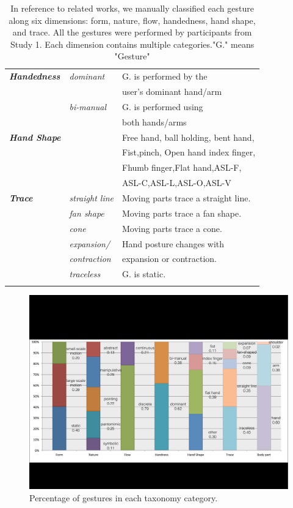 \documentclass{sigchi}
\begin{document}
\begin{table}
\begin{adjustwidth}{-0.4cm}{}
\begin{tabular}{|l|l|l|}
    \textit{\textbf {Handedness}} & {\it dominant} & G. is performed by the \\&&user's dominant hand/arm \\ \cline{2-3}
    &{\it bi-manual}&G. is performed using \\&&both hands/arms\\
    \Xhline{4\arrayrulewidth}
    \textit{\textbf {Hand Shape}} &&Free hand, ball holding, bent hand,\\&& Fist,pinch, Open hand
    index finger,\\&&Fhumb finger,Flat hand,ASL-F,\\&&ASL-C,ASL-L,ASL-O,ASL-V\\
    \Xhline{4\arrayrulewidth}
    \textit{\textbf {Trace}}&{\it straight line}&Moving parts trace a straight line.\\ \cline{2-3}
    &{\it fan shape}&Moving parts trace a fan shape.\\ \cline{2-3}
    &{\it cone}&Moving parts trace a cone.\\ \cline{2-3}
    &{\it expansion/}&Hand posture changes with \\&{\it contraction}&expansion or contraction.\\
     \cline{2-3}
    &{\it traceless}&G. is static.\\
    \Xhline{4\arrayrulewidth}
  \end{tabular}
  \caption{In reference to related works, we manually classified each gesture along six dimensions: form, nature, flow, handedness, hand shape, and trace. All the gestures were performed by participants from Study 1. Each dimension contains multiple categories."G." means "Gesture"}
  \label{tab:classificationTable}
  \end{adjustwidth}
\end{table}

\begin{figure}[!h]
\centering
\includegraphics[width=2\columnwidth]{taxonomy.pdf}
\caption{Percentage of gestures in each taxonomy category.}
\label{fig:taxonomyFigure}
\end{figure}
\end{document}
